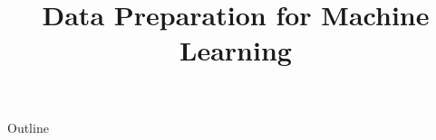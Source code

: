 \documentclass[xcolor=dvipsnames,compress,t,pdf,9pt]{beamer}
\title[\insertframenumber /\inserttotalframenumber]{Data Preparation for Machine Learning}
\begin{document}
	\begin{frame}
	\titlepage
	\end{frame}

	\begin{frame}{Outline}
	    \tableofcontents
	\end{frame}

	
	
	
\end{document}
